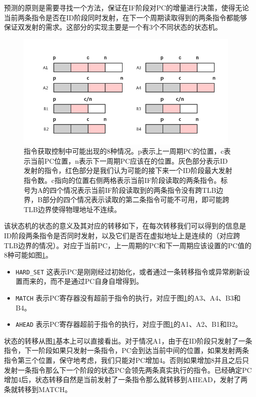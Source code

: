 预测的原则是需要寻找一个方法，保证在IF阶段对PC的增量进行决策，使得无论当前两条指令是否在ID阶段同时发射，在下一个周期读取得到的两条指令都能够保证双发射的需求。这部分的实现主要是一个有3个不同状态的状态机。

\begin{figure}[htbp]
	\centering
	\includegraphics[width=4.3in]{emit-prediction.png}
	\caption{指令获取控制中可能出现的8种情况。p表示上一周期PC的位置，c表示当前PC位置，n表示下一周期PC应该在的位置。灰色部分表示ID发射的指令，红色部分是我们认为可能的接下来一个ID阶段最大发射指令数。c指向的位置右侧两格表示当前IF阶段读取的两条指令。标号为A的四个情况表示当前IF阶段读取到的两条指令没有跨TLB边界，B部分的四个情况表示读取的第二条指令可能不可用，即可能跨TLB边界使得物理地址不连续。}
	\label{fig:emit-prediction}
\end{figure}

该状态机的状态的意义及其对应的转移如下，在每次转移我们可以得到的信息是ID阶段两条指令是否同时发射，以及它们是否在虚拟地址上是连续的（对应跨TLB边界的情况）。对应于当前PC，上一周期的PC和下一周期应该设置的PC值的8种可能如图\ref{fig:emit-prediction}。
\begin{itemize}
	\item \texttt{HARD\_SET} 这表示PC是刚刚经过初始化，或者通过一条转移指令或异常刷新设置而来的，而不是通过PC自身自增得到。
	\item \texttt{MATCH} 表示PC寄存器没有超前于指令的执行，对应于图\ref{fig:emit-prediction}的A3、A4、B3和B4。
	\item \texttt{AHEAD} 表示PC寄存器超前于指令的执行，对应于图\ref{fig:emit-prediction}的A1、A2、B1和B2。
\end{itemize}

状态的转移从图\ref{fig:emit-prediction}基本上可以直接看出。对于情况A1，由于在ID阶段只发射了一条指令，下一阶段如果只发射一条指令，PC会到达当前中间的位置，如果发射两条指令第三个位置，保守地考虑，我们只能对PC增加4。否则如果增加8并且之后只发射一条指令那么下一个阶段的状态PC会领先两条真实执行的指令。已经确定PC增加4后，状态转移自然是当前发射了一条指令那么就转移到AHEAD，发射了两条就转移到MATCH。

